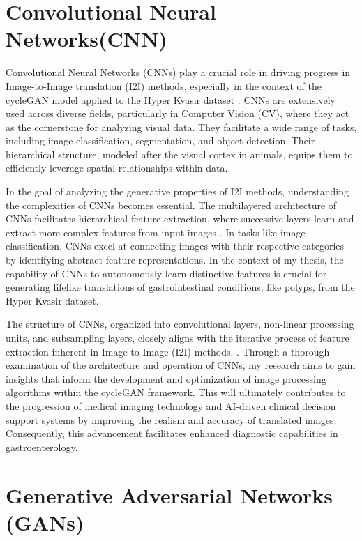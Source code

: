 \documentclass[UKenglish,12pt]{master-style}
\begin{document}
\section{Convolutional Neural Networks(CNN)}

\vspace{-12pt}Convolutional Neural Networks (CNNs) play a crucial role in driving progress in Image-to-Image translation (I2I) methods, especially in the context of the cycleGAN model applied to the Hyper Kvasir dataset \cite{CNN} . CNNs are extensively used across diverse fields, particularly in Computer Vision (CV), where they act as the cornerstone for analyzing visual data. They facilitate a wide range of tasks, including image classification, segmentation, and object detection. Their hierarchical structure, modeled after the visual cortex in animals, equips them to efficiently leverage spatial relationships within data.

In the goal of analyzing the generative properties of I2I methods, understanding the complexities of CNNs becomes essential. The multilayered architecture of CNNs facilitates hierarchical feature extraction, where successive layers learn and extract more complex features from input images \cite{deep_CNN}. In tasks like image classification, CNNs excel at connecting images with their respective categories by identifying abstract feature representations. In the context of my thesis, the capability of CNNs to autonomously learn distinctive features is crucial for generating lifelike translations of gastrointestinal conditions, like polyps, from the Hyper Kvasir dataset.

The structure of CNNs, organized into convolutional layers, non-linear processing units, and subsampling layers, closely aligns with the iterative process of feature extraction inherent in Image-to-Image (I2I) methods.\cite{CNN} . Through a thorough examination of the architecture and operation of CNNs, my research aims to gain insights that inform the development and optimization of image processing algorithms within the cycleGAN framework. This will ultimately contributes to the progression of medical imaging technology and AI-driven clinical decision support systems by improving the realism and accuracy of translated images. Consequently, this advancement facilitates enhanced diagnostic capabilities in gastroenterology.

\section{Generative Adversarial Networks (GANs)}
\end{document}
